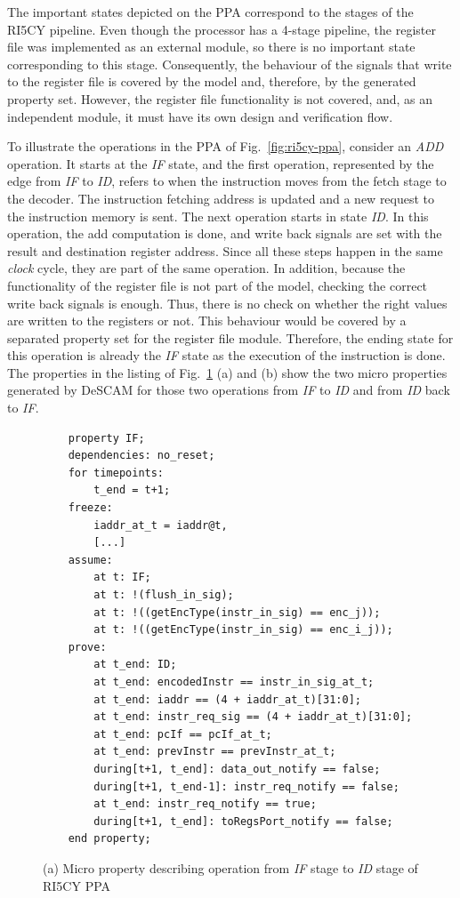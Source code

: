 The important states depicted on the PPA correspond to the stages of the RI5CY pipeline. Even though the processor has a 4-stage pipeline, the register file was implemented as an external module, so there is no important state corresponding to this stage. Consequently, the behaviour of the signals that write to the register file is covered by the model and, therefore, by the generated property set. However, the register file functionality is not covered, and, as an independent module, it must have its own design and verification flow.

To illustrate the operations in the PPA of Fig.~\ref{fig:ri5cy-ppa}, consider an \textit{ADD} operation. It starts at the \textit{IF} state, and the first operation, represented by the edge from \textit{IF} to \textit{ID}, refers to when the instruction moves from the fetch stage to the decoder. The instruction fetching address is updated and a new request to the instruction memory is sent. The next operation starts in state \textit{ID}. In this operation, the add computation is done, and write back signals are set with the result and destination register address. Since all these steps happen in the same \textit{clock} cycle, they are part of the same operation. In addition, because the functionality of the register file is not part of the model, checking the correct write back signals is enough. Thus, there is no check on whether the right values are written to the registers or not. This behaviour would be covered by a separated property set for the register file module. Therefore, the ending state for this operation is already the \textit{IF} state as the execution of the instruction is done. The properties in the listing of Fig.~\ref{fig:ri5cy-if-id-micro-ppt-a} (a) and (b) show the two micro properties generated by DeSCAM for those two operations from \textit{IF} to \textit{ID} and from \textit{ID} back to \textit{IF}.

\begin{figure}[htb]
    \begin{lstlisting}
    property IF;
    dependencies: no_reset;
    for timepoints:
        t_end = t+1;
    freeze:
        iaddr_at_t = iaddr@t,
        [...]
    assume:
        at t: IF;
        at t: !(flush_in_sig);
        at t: !((getEncType(instr_in_sig) == enc_j));
        at t: !((getEncType(instr_in_sig) == enc_i_j));
    prove:
        at t_end: ID;
        at t_end: encodedInstr == instr_in_sig_at_t;
        at t_end: iaddr == (4 + iaddr_at_t)[31:0];
        at t_end: instr_req_sig == (4 + iaddr_at_t)[31:0];
        at t_end: pcIf == pcIf_at_t;
        at t_end: prevInstr == prevInstr_at_t;
        during[t+1, t_end]: data_out_notify == false;
        during[t+1, t_end-1]: instr_req_notify == false;
        at t_end: instr_req_notify == true;
        during[t+1, t_end]: toRegsPort_notify == false;
    end property;\end{lstlisting}
    \caption{(a) Micro property describing operation from \textit{IF} stage to \textit{ID} stage of RI5CY PPA}
    \label{fig:ri5cy-if-id-micro-ppt-a}
\end{figure}

